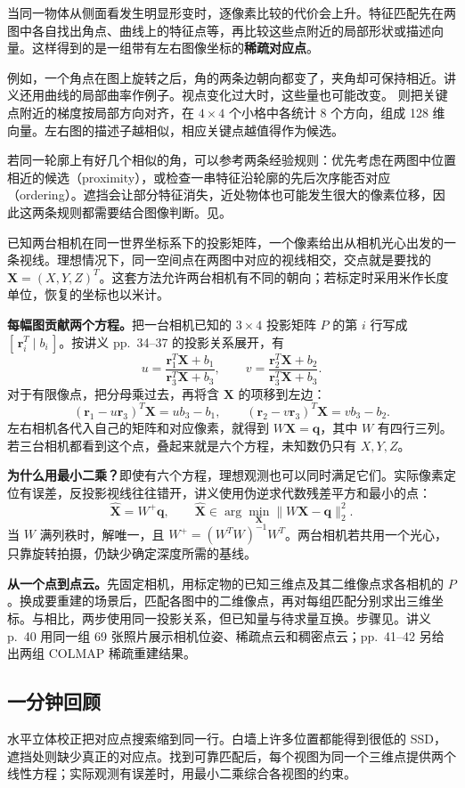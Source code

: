 
当同一物体从侧面看发生明显形变时，逐像素比较的代价会上升。特征匹配先在两图中各自找出角点、曲线上的特征点等，再比较这些点附近的局部形状或描述向量。这样得到的是一组带有左右图像坐标的\textbf{稀疏对应点}。

例如，一个角点在图上旋转之后，角的两条边朝向都变了，夹角却可保持相近。讲义还用曲线的局部曲率作例子。视点变化过大时，这些量也可能改变。
则把关键点附近的梯度按局部方向对齐，在 $4\times4$ 个小格中各统计 8 个方向，组成 128 维向量。左右图的描述子越相似，相应关键点越值得作为候选。

若同一轮廓上有好几个相似的角，可以参考两条经验规则：优先考虑在两图中位置相近的候选（proximity），或检查一串特征沿轮廓的先后次序能否对应（ordering）。遮挡会让部分特征消失，近处物体也可能发生很大的像素位移，因此这两条规则都需要结合图像判断。见。


已知两台相机在同一世界坐标系下的投影矩阵，一个像素给出从相机光心出发的一条视线。理想情况下，同一空间点在两图中对应的视线相交，交点就是要找的 $\bm X=(X,Y,Z)^T$。这套方法允许两台相机有不同的朝向；若标定时采用米作长度单位，恢复的坐标也以米计。

\textbf{每幅图贡献两个方程。}把一台相机已知的 $3\times4$ 投影矩阵 $P$ 的第 $i$ 行写成 $[\,\bm r_i^T\mid b_i\,]$。按讲义 pp.~34--37 的投影关系展开，有
\[
 u=\frac{\bm r_1^T\bm X+b_1}{\bm r_3^T\bm X+b_3},\qquad
 v=\frac{\bm r_2^T\bm X+b_2}{\bm r_3^T\bm X+b_3}.
\]
对于有限像点，把分母乘过去，再将含 $\bm X$ 的项移到左边：
\[
 (\bm r_1-u\bm r_3)^T\bm X=u b_3-b_1,\qquad
 (\bm r_2-v\bm r_3)^T\bm X=v b_3-b_2.
\]
左右相机各代入自己的矩阵和对应像素，就得到 $W\bm X=\bm q$，其中 $W$ 有四行三列。若三台相机都看到这个点，叠起来就是六个方程，未知数仍只有 $X,Y,Z$。

\textbf{为什么用最小二乘？}即使有六个方程，理想观测也可以同时满足它们。实际像素定位有误差，反投影视线往往错开，讲义使用伪逆求代数残差平方和最小的点：
\[
 \hat{\bm X}=W^+\bm q,\qquad
 \hat{\bm X}\in\arg\min_{\bm X}\|W\bm X-\bm q\|_2^2.
\]
当 $W$ 满列秩时，解唯一，且 $W^+=(W^TW)^{-1}W^T$。两台相机若共用一个光心，只靠旋转拍摄，仍缺少确定深度所需的基线。

\textbf{从一个点到点云。}先固定相机，用标定物的已知三维点及其二维像点求各相机的 $P$。换成要重建的场景后，匹配各图中的二维像点，再对每组匹配分别求出三维坐标。与相比，两步使用同一投影关系，但已知量与待求量互换。步骤见。讲义 p.~40 用同一组 69 张照片展示相机位姿、稀疏点云和稠密点云；pp.~41--42 另给出两组 COLMAP 稀疏重建结果。

\subsection{一分钟回顾}

水平立体校正把对应点搜索缩到同一行。白墙上许多位置都能得到很低的 SSD，遮挡处则缺少真正的对应点。找到可靠匹配后，每个视图为同一个三维点提供两个线性方程；实际观测有误差时，用最小二乘综合各视图的约束。
